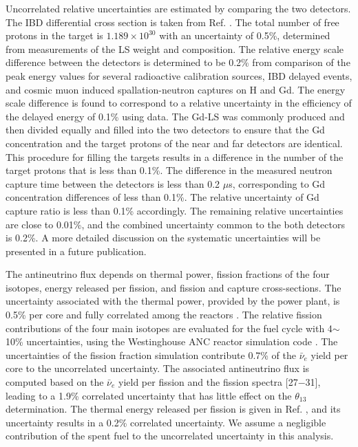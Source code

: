 \documentclass[aps,prl,twocolumn,superscriptaddress,showpacs]{revtex4-1}
\begin{document}
Uncorrelated relative uncertainties are estimated by comparing the two detectors. The IBD differential cross section is taken from Ref. \cite{ref_23}. The total number of free protons in the target is $1.189 \times 10^{30}$ with an uncertainty of 0.5\%, determined from measurements of the LS weight and composition. The relative energy scale difference between the detectors is determined to be 0.2\% from comparison of the peak energy values for several radioactive calibration sources, IBD delayed events, and cosmic muon induced spallation-neutron captures on H and Gd. The energy scale difference is found to correspond to a relative uncertainty in the efficiency of the delayed energy of 0.1\% using data. The Gd-LS was commonly produced and then divided equally and filled into the two detectors to ensure that the Gd concentration and the target protons of the near and far detectors are identical. This procedure for filling the targets results in a difference in the number of the target protons that is less than 0.1\%. The difference in the measured neutron capture time between the detectors is less than 0.2 $\mu$s, corresponding to Gd concentration differences of less than 0.1\%. The relative uncertainty of Gd capture ratio is less than 0.1\% accordingly.
The remaining relative uncertainties are close to 0.01\%, and the combined uncertainty common to the both detectors is 0.2\%. A more detailed discussion on the systematic uncertainties will be presented in a future publication. 

The antineutrino flux depends on thermal power, fission fractions of the four isotopes, energy released per fission, and fission and capture cross-sections. The uncertainty associated with the thermal power, provided by the power plant, is 0.5\% per core and fully correlated among the reactors \cite{ref_24}. The relative fission contributions of the four main isotopes are evaluated for the fuel cycle with 4$\sim$10\% uncertainties, using the Westinghouse ANC reactor simulation code \cite{ref_25}. The uncertainties of the fission fraction simulation contribute 0.7\% of the $\bar{\nu}_e$ yield per core to the uncorrelated uncertainty. The associated antineutrino flux is computed based on the $\bar{\nu}_e$ yield per fission \cite{ref_26} and the fission spectra [27$-$31], leading to a 1.9\% correlated uncertainty that has little effect on the $\theta_{13}$ determination. The thermal energy released per fission is given in Ref. \cite{ref_32}, and its uncertainty results in a 0.2\% correlated uncertainty. We assume a negligible contribution of the spent fuel to the uncorrelated uncertainty in this analysis. 
\end{document}

